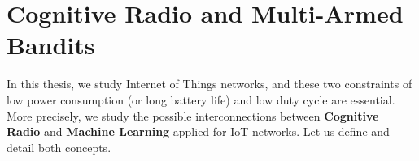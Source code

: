 

\section{Cognitive Radio and Multi-Armed Bandits}

In this thesis, we study Internet of Things networks, and these two constraints of low power consumption (or long battery life) and low duty cycle are essential.
More precisely, we study the possible interconnections between \textbf{Cognitive Radio} and \textbf{Machine Learning} applied for IoT networks.
Let us define and detail both concepts.




